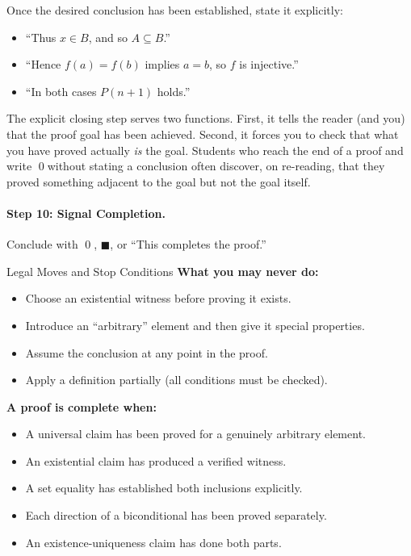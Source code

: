 Once the desired conclusion has been established, state it explicitly:

\begin{itemize}[itemsep=2pt]
  \item ``Thus $x \in B$, and so $A \subseteq B$.''
  \item ``Hence $f(a) = f(b)$ implies $a = b$, so $f$ is injective.''
  \item ``In both cases $P(n+1)$ holds.''
\end{itemize}

The explicit closing step serves two functions. First, it tells the reader
(and you) that the proof goal has been achieved. Second, it forces you to
check that what you have proved actually \emph{is} the goal. Students who
reach the end of a proof and write \qed without stating a conclusion often
discover, on re-reading, that they proved something adjacent to the goal
but not the goal itself.

\paragraph{Step 10: Signal Completion.}

Conclude with \qed, $\blacksquare$, or ``This completes the proof.''

\bigskip

\begin{propositionbox}{Legal Moves and Stop Conditions}
\textbf{What you may never do:}
\begin{itemize}[itemsep=2pt]
  \item Choose an existential witness before proving it exists.
  \item Introduce an ``arbitrary'' element and then give it special properties.
  \item Assume the conclusion at any point in the proof.
  \item Apply a definition partially (all conditions must be checked).
\end{itemize}

\medskip
\textbf{A proof is complete when:}
\begin{itemize}[itemsep=2pt]
  \item A universal claim has been proved for a genuinely arbitrary element.
  \item An existential claim has produced a verified witness.
  \item A set equality has established both inclusions explicitly.
  \item Each direction of a biconditional has been proved separately.
  \item An existence-uniqueness claim has done both parts.
\end{itemize}
\end{propositionbox}

